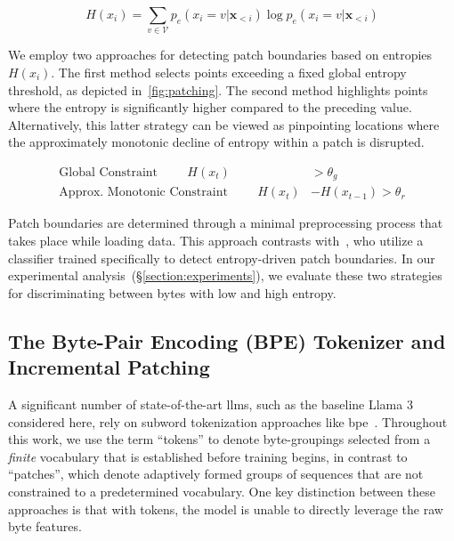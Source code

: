 \begin{equation}
H(x_i) = \sum_{v \in \mathcal{V}} p_{e}(x_i=v|\pmb{x}_{<i}) \log p_{e}(x_i=v|\pmb{x}_{<i})
\end{equation}

We employ two approaches for detecting patch boundaries based on entropies $H(x_i)$. The first method selects points exceeding a fixed global entropy threshold, as depicted in~\autoref{fig:patching}. The second method highlights points where the entropy is significantly higher compared to the preceding value. Alternatively, this latter strategy can be viewed as pinpointing locations where the approximately monotonic decline of entropy within a patch is disrupted.

\begin{align*}
    \text{Global Constraint}\hspace{1cm}H(x_t)& > \theta_g\\
    \text{Approx. Monotonic Constraint}\hspace{1cm}H(x_t)& - H(x_{t-1}) > \theta_r
\end{align*}

Patch boundaries are determined through a minimal preprocessing process that takes place while loading data. This approach contrasts with~\citet{nawrot-etal-2023-efficient}, who utilize a classifier trained specifically to detect entropy-driven patch boundaries. In our experimental analysis~(\S\ref{section:experiments}), we evaluate these two strategies for discriminating between bytes with low and high entropy.

\subsection{The Byte-Pair Encoding (BPE) Tokenizer and Incremental Patching}
\label{section:incremental-patching}
\label{section:bpe-patch}

A significant number of state-of-the-art llms, such as the baseline Llama 3 considered here, rely on subword tokenization approaches like bpe~\citep{gage1994new, sennrich-etal-2016-neural}. Throughout this work, we use the term ``tokens'' to denote byte-groupings selected from a \textit{finite} vocabulary that is established before training begins, in contrast to ``patches'', which denote adaptively formed groups of sequences that are not constrained to a predetermined vocabulary. One key distinction between these approaches is that with tokens, the model is unable to directly leverage the raw byte features.

